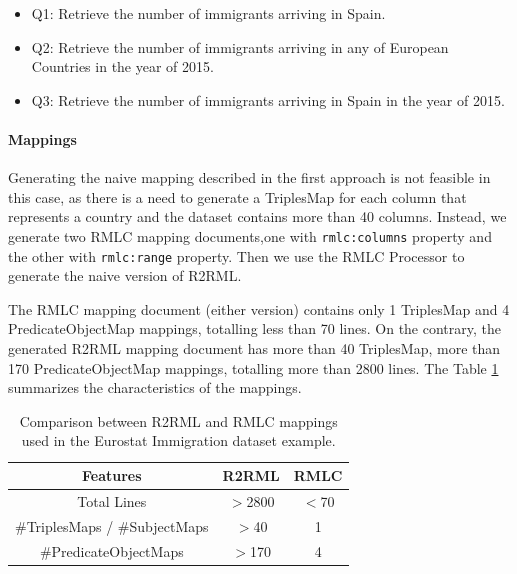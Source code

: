 \begin{itemize}
\item Q1: Retrieve the number of immigrants arriving in Spain.
\item Q2: Retrieve the number of immigrants arriving in any of European Countries in the year of 2015.
\item Q3: Retrieve the number of immigrants arriving in Spain in the year of 2015.
\end{itemize}

\noindent\paragraph{Mappings}
Generating the naive mapping described in the first approach is not feasible in this case, as there is a need to generate a TriplesMap for each column that represents a country and the dataset contains more than 40 columns. Instead, we generate two RMLC mapping documents,one with \texttt{rmlc:columns} property and the other with \texttt{rmlc:range} property. Then we use the RMLC Processor to generate the naive version of R2RML.

The RMLC mapping document (either version) contains only 1 TriplesMap and 4 PredicateObjectMap mappings, totalling less than 70 lines. On the contrary, the generated R2RML mapping document has more than 40 TriplesMap, more than 170 PredicateObjectMap mappings, totalling more than 2800 lines. The Table \ref{table:compare2} summarizes the characteristics of the mappings.
\begin{table}[tbp]
\caption[R2RML vs RMLC in Eurostat dataset]{Comparison between R2RML and RMLC mappings used in the Eurostat Immigration dataset example.}
\label{table:compare2}
\begin{tabular}{c|c|c}
\hline
\textbf{Features} & \textbf{R2RML}   & \textbf{RMLC}  \\ \hline
Total Lines   & $>$2800 & $<$70 \\ 
\#TriplesMaps / \#SubjectMaps     & $>$40                & 1           \\
\#PredicateObjectMaps  & $>$170              & 4            \\ \hline
\end{tabular}
\end{table}